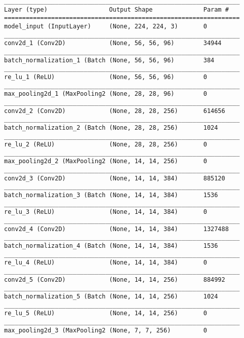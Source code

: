 \begin{lstlisting}[caption={Alexnet Classifier},captionpos=b,basicstyle=\tiny, label={lst:alexnet-classifier}]
_________________________________________________________________
Layer (type)                 Output Shape              Param #
=================================================================
model_input (InputLayer)     (None, 224, 224, 3)       0
_________________________________________________________________
conv2d_1 (Conv2D)            (None, 56, 56, 96)        34944
_________________________________________________________________
batch_normalization_1 (Batch (None, 56, 56, 96)        384
_________________________________________________________________
re_lu_1 (ReLU)               (None, 56, 56, 96)        0
_________________________________________________________________
max_pooling2d_1 (MaxPooling2 (None, 28, 28, 96)        0
_________________________________________________________________
conv2d_2 (Conv2D)            (None, 28, 28, 256)       614656
_________________________________________________________________
batch_normalization_2 (Batch (None, 28, 28, 256)       1024
_________________________________________________________________
re_lu_2 (ReLU)               (None, 28, 28, 256)       0
_________________________________________________________________
max_pooling2d_2 (MaxPooling2 (None, 14, 14, 256)       0
_________________________________________________________________
conv2d_3 (Conv2D)            (None, 14, 14, 384)       885120
_________________________________________________________________
batch_normalization_3 (Batch (None, 14, 14, 384)       1536
_________________________________________________________________
re_lu_3 (ReLU)               (None, 14, 14, 384)       0
_________________________________________________________________
conv2d_4 (Conv2D)            (None, 14, 14, 384)       1327488
_________________________________________________________________
batch_normalization_4 (Batch (None, 14, 14, 384)       1536
_________________________________________________________________
re_lu_4 (ReLU)               (None, 14, 14, 384)       0
_________________________________________________________________
conv2d_5 (Conv2D)            (None, 14, 14, 256)       884992
_________________________________________________________________
batch_normalization_5 (Batch (None, 14, 14, 256)       1024
_________________________________________________________________
re_lu_5 (ReLU)               (None, 14, 14, 256)       0
_________________________________________________________________
max_pooling2d_3 (MaxPooling2 (None, 7, 7, 256)         0

\end{lstlisting}
